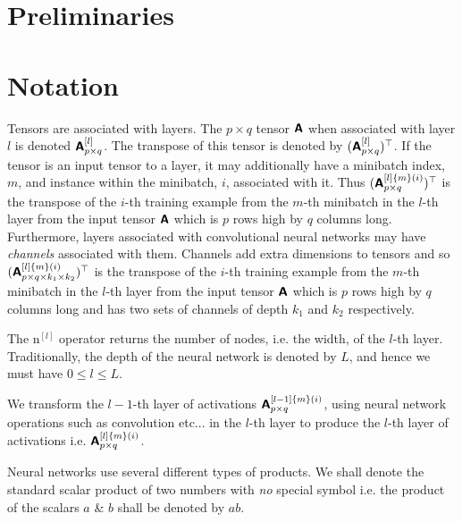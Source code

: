 \documentclass[modern]{aastex61}
\newcommand{\un}{\mathrm{n}}
\begin{document}

\section{Preliminaries} \label{sec:prelim}

\section{Notation} \label{sec:notation}


Tensors are associated with layers. The $p \times q$ tensor $\textbf{\textsf{A}}$ when associated with layer $l$ is denoted $\textbf{\textsf{A}}_{p \times q}^{[l]}$. The transpose of this tensor is denoted by $(\textbf{\textsf{A}}_{p \times q}^{[l]})^{\top}$. If the tensor is an input tensor to a layer, it may additionally have a minibatch index, $m$, and instance within the minibatch, $i$, associated with it. Thus $(\textbf{\textsf{A}}_{p \times q}^{[l]\{m\}(i)})^{\top}$ is the transpose of the $i$-th training example from the $m$-th minibatch in the $l$-th layer from the input tensor $\textbf{\textsf{A}}$ which is $p$ rows high by $q$ columns long. Furthermore, layers associated with convolutional neural networks may have \textit{channels} associated with them. Channels add extra dimensions to tensors and so $(\textbf{\textsf{A}}_{p \times q \times k_{1} \times k_{2}}^{[l]\{m\}(i)})^{\top}$ is the transpose of the $i$-th training example from the $m$-th minibatch in the $l$-th layer from the input tensor $\textbf{\textsf{A}}$ which is $p$ rows high by $q$ columns long and has two sets of channels of depth $k_{1}$ and $k_{2}$ respectively.

The $\un^{[l]}$ operator returns the number of nodes, i.e. the width, of the $l$-th layer. Traditionally, the depth of the neural network is denoted by $L$, and hence we must have $0 \leq l \leq L$.

We transform the $l-1$-th layer of activations $\textbf{\textsf{A}}_{p \times q}^{[l-1]\{m\}(i)}$, using neural network operations such as convolution etc... in the $l$-th layer to produce the $l$-th layer of activations i.e. $\textbf{\textsf{A}}_{p \times q}^{[l]\{m\}(i)}$.

Neural networks use several different types of products. We shall denote the standard scalar product of two numbers with \textit{no} special symbol i.e. the product of the scalars $a$ \& $b$ shall be denoted by $ab$.
\end{document}
